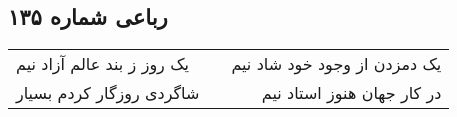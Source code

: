 \begin{center}
\section*{رباعی شماره ۱۳۵}
\label{sec:sh135}
\begin{longtable}{l p{0.5cm} r}
یک روز ز بند عالم آزاد نیم
&&
یک دمزدن از وجود خود شاد نیم
\\
شاگردی روزگار کردم بسیار
&&
در کار جهان هنوز استاد نیم
\\
\end{longtable}
\end{center}
